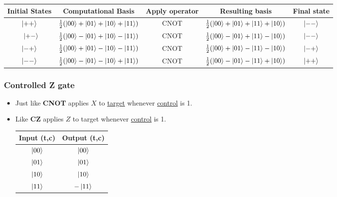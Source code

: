 \documentclass{article}
\begin{document}
\begin{itemize}
\begin{table}[h]
        \begin{tabular}{c|c|c|c|c}
        \hline
        Initial States & Computational Basis & Apply operator & Resulting basis & Final state \\
        \hline 
            \vspace{0.3cm}
            $\ket{++}$ & $\frac{1}{2}(\ket{00}+\ket{01}+\ket{10}+\ket{11})$ & CNOT & $\frac{1}{2}(\ket{00}+\ket{01}+\ket{11}+\ket{10})$ & $\ket{--}$ \\
            \vspace{0.3cm}\
            $\ket{+-}$ & $\frac{1}{2}(\ket{00}-\ket{01}+\ket{10}-\ket{11})$ & CNOT & $\frac{1}{2}(\ket{00}-\ket{01}+\ket{11}-\ket{10})$ & $\ket{--}$ \\
            \vspace{0.2cm}
            $\ket{-+}$ & $\frac{1}{2}(\ket{00}+\ket{01}-\ket{10}-\ket{11})$ & CNOT & $\frac{1}{2}(\ket{00}+\ket{01}-\ket{11}-\ket{10})$ & $\ket{-+}$ \\
            \vspace{0.2cm}
            $\ket{--}$ & $\frac{1}{2}(\ket{00}-\ket{01}-\ket{10}+\ket{11})$ & CNOT & $\frac{1}{2}(\ket{00}-\ket{01}-\ket{11}+\ket{10})$ & $\ket{++}$ \\
             
        \hline
             
        \end{tabular}
    \end{table}
    
    
\end{itemize}
\newpage
\subsubsection{Controlled Z gate}
\begin{itemize}
    \item Just like \textbf{CNOT} applies $X$ to \underline{target} whenever \underline{control} is 1.
    \item Like \textbf{CZ} applies $Z$ to target whenever \underline{control} is 1.
    \begin{table}[h]
        \centering
        \begin{tabular}{|c|c|}
        \hline
        Input (t,c) & Output (t,c)\\
        \hline
           $\ket{00}$  & $\ket{00}$\\
           $\ket{01}$  & $\ket{01}$\\
           $\ket{10}$  & $\ket{10}$\\
           $\ket{11}$  & $-\ket{11}$\\
           \hline
        \end{tabular}
    \end{table}
\end{itemize}
\end{document}
